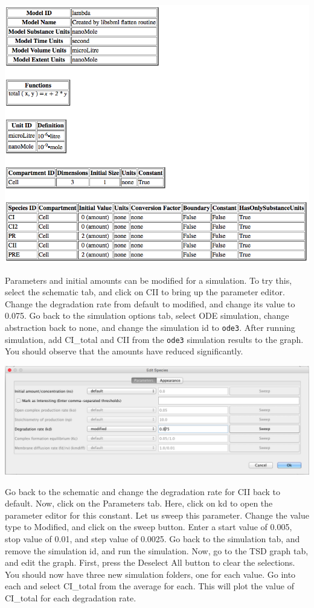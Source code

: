 \documentclass[titlepage,11pt]{article}
\begin{document}
\begin{center}
\includegraphics[width=160mm]{screenshots/viewBrowser}
\end{center}

Parameters and initial amounts can be modified for a simulation.  To try this, select the schematic tab, and click on CII to bring up the parameter editor.  Change the degradation rate from default to modified, and change its value to 0.075.  Go back to the simulation options tab, select ODE simulation, change abstraction back to none, and change the simulation id to {\tt ode3}.  After running simulation, add CI\_total and CII from the {\tt ode3} simulation results to the graph.  You should observe that the amounts have reduced significantly.

\begin{center}
\includegraphics[width=160mm]{screenshots/paramEdit}
\end{center}

Go back to the schematic and change the degradation rate for CII back to default.  Now, click on the Parameters tab.  Here, click on kd to open the parameter editor for this constant.  Let us sweep this parameter.  Change the value type to Modified, and click on the sweep button.  Enter a start value of 0.005, stop value of 0.01, and step value of 0.0025.  Go back to the simulation tab, and remove the simulation id, and run the simulation.  Now, go to the TSD graph tab, and edit the graph.  First, press the Deselect All button to clear the selections.  You should now have three new simulation folders, one for each value.  Go into each and select CI\_total from the average for each.  This will plot the value of CI\_total for each degradation rate.
\end{document}
